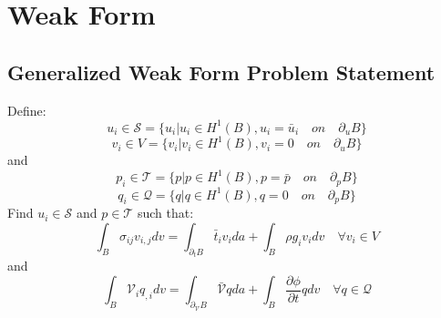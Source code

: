 \documentclass[11pt]{article} %
\begin{document}
\newpage
\section{Weak Form}
\subsection{Generalized Weak Form Problem Statement}
Define:
\begin{equation}
	u_i \in \mathcal{S} = \{ u_i | u_i \in H^1 (B), u_i = \bar{u}_i \quad on \quad \partial_u B \}
\end{equation}
\begin{equation}
	v_i \in V = \{ v_i | v_i \in H^1 (B), v_i = 0 \quad on \quad \partial_u B \}
\end{equation}
and
\begin{equation}
	p_i \in \mathcal{T} = \{ p | p \in H^1 (B), p = \bar{p} \quad on \quad \partial_p B \}
\end{equation}
\begin{equation}
	q_i \in \mathcal{Q} = \{  q | q \in H^1 (B), q = 0 \quad on \quad \partial_p B \}
\end{equation}
Find $u_i \in \mathcal{S}$ and $p \in \mathcal{T}$ such that:
\begin{equation}
	\int_B \sigma_{ij} v_{i,j} dv = \int_{\partial_t B} \bar{t}_i v_i da + \int_B \rho g_i v_i dv \quad \forall v_i \in V
\end{equation}
and
\begin{equation}
	\int_B \mathcal{V}_i q_{,i} dv = \int_{\partial_{\mathcal{V}} B} \bar{\mathcal{V}} q da + \int_B \frac{\partial \phi}{\partial t} q dv \quad \forall q \in \mathcal{Q}
\end{equation}
\end{document}
